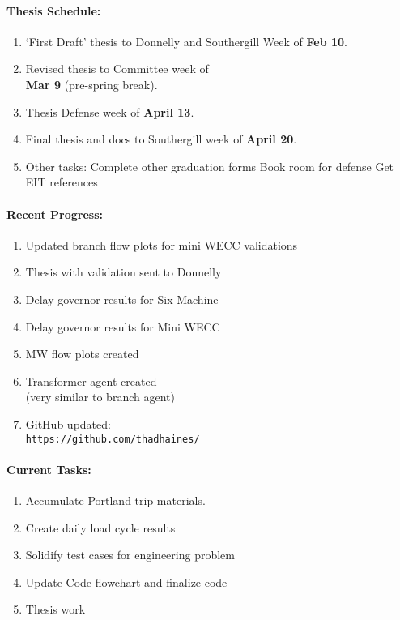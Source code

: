 \documentclass[12pt]{article}
\begin{document}
\begin{multicols}{2}
\raggedright
	\paragraph{Thesis Schedule:}
	\begin{enumerate}
\itemsep0em 
		\item `First Draft' thesis to Donnelly and Southergill Week of\textbf{ Feb 10}.
		\item Revised thesis to Committee week of \\ \textbf{Mar 9} (pre-spring break).
		\item Thesis Defense week of \textbf{April 13}.
		\item Final thesis and docs to Southergill week of \textbf{April 20}.
\item Other tasks:
\subitem Complete other graduation forms
\subitem Book room for defense
\subitem Get EIT references
\end{enumerate}

	\paragraph{Recent Progress:}
	\begin{enumerate}
\itemsep0em 
\item Updated branch flow plots for mini WECC validations
\item Thesis with validation sent to Donnelly
\item Delay governor results for Six Machine
\item Delay governor results for Mini WECC
\item MW flow plots created
\item Transformer agent created \\ (very similar to branch agent)

		\item GitHub updated:\\
		\verb|https://github.com/thadhaines/ |

\vfill\null
\columnbreak
	
	\end{enumerate}
\paragraph{Current Tasks:}
	\begin{enumerate}
		\itemsep0em 
		\item Accumulate Portland trip materials.
		\item Create daily load cycle results
		\item Solidify test cases for engineering problem
		\item Update Code flowchart and finalize code%
		\item Thesis work 


\end{enumerate}
\end{multicols}
\end{document}
